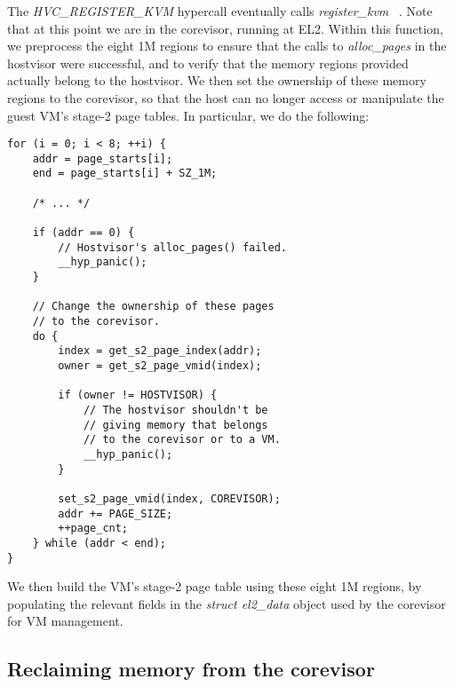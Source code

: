 The \textit{HVC\_REGISTER\_KVM} hypercall eventually calls \textit{register\_kvm}
~\cite{el2.c}. Note that at this point we are in the corevisor, running at EL2.
Within this function, we preprocess the eight 1M regions to ensure that the
calls to \textit{alloc\_pages} in the hostvisor were successful, and to verify
that the memory regions provided actually belong to the hostvisor. We then set
the ownership of these memory regions to the corevisor, so that the host can
no longer access or manipulate the guest VM's stage-2 page tables. In particular,
we do the following:

\begin{verbatim}
for (i = 0; i < 8; ++i) {
    addr = page_starts[i];
    end = page_starts[i] + SZ_1M;

    /* ... */

    if (addr == 0) {
        // Hostvisor's alloc_pages() failed.
        __hyp_panic();
    }

    // Change the ownership of these pages
    // to the corevisor.
    do {
        index = get_s2_page_index(addr);
        owner = get_s2_page_vmid(index);

        if (owner != HOSTVISOR) {
            // The hostvisor shouldn't be
            // giving memory that belongs
            // to the corevisor or to a VM.
            __hyp_panic();
        }

        set_s2_page_vmid(index, COREVISOR);
        addr += PAGE_SIZE;
        ++page_cnt;
    } while (addr < end);
}
\end{verbatim}

\noindent We then build the VM's stage-2 page table using these eight 1M regions, by
populating the relevant fields in the \textit{struct el2\_data} object used
by the corevisor for VM management.

\subsection{Reclaiming memory from the corevisor}


